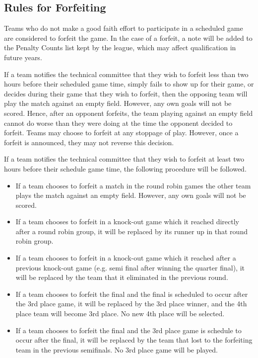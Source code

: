 \documentclass[12pt]{article}
\begin{document}
\subsection{Rules for Forfeiting}
\label{sec:forfeit}

Teams who do not make a good faith effort to participate in a scheduled game are considered to forfeit the game.  In the case of a forfeit, a note will be added to the Penalty Counts list kept by the league, which may affect qualification in future years.

If a team notifies the technical committee that they wish to forfeit less than two hours before their scheduled game time, simply fails to show up for their game, or decides during their game that they wish to forfeit, then the opposing team will play the match against an empty field.  However, any own goals will not be scored.  Hence, after an opponent forfeits, the team playing against an empty field cannot do worse than they were doing at the time the opponent decided to forfeit.  Teams may choose to forfeit at any stoppage of play.  However, once a forfeit is announced, they may not reverse this decision.

If a team notifies the technical committee that they wish to forfeit at least two hours before their schedule game time, the following procedure will be followed.

\begin{itemize}
\item If a team chooses to forfeit a match in the round robin games the other team plays the match against an empty field.  However, any own goals will not be scored.
\item If a team chooses to forfeit in a knock-out game which it reached directly after a round robin group, it will be replaced by its runner up in that round robin group.
\item If a team chooses to forfeit in a knock-out game which it reached after a previous knock-out game (e.g. semi final after winning the quarter final), it will be replaced by the team that it eliminated in the previous round.
\item If a team chooses to forfeit the final and the final is scheduled to occur after the 3rd place game, it will be replaced by the 3rd place winner, and the 4th place team will become 3rd place. No new 4th place will be selected.
\item If a team chooses to forfeit the final and the 3rd place game is schedule to occur after the final, it will be replaced by the team that lost to the forfeiting team in the previous semifinals. No 3rd place game will be played.
\end{itemize}
\end{document}
